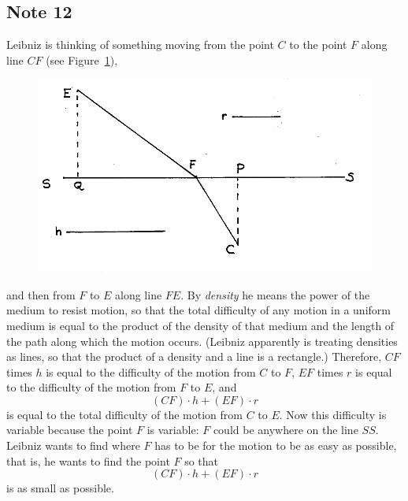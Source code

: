 \documentclass[twoside,openright]{article}
\begin{document}
\subsection*{Note 12}
\label{cnm12}

Leibniz is thinking of something moving from the point $C$ to the
point $F$ along line $CF$ (see Figure~\ref{leasttimeA}),
\begin{figure}[htp]
\begin{center}
\includegraphics[width=.85\textwidth]{fig/Figure21}
\caption{}
\label{leasttimeA}
\vspace{-10pt}
\end{center}
\end{figure} and then from $F$ to $E$ along line $FE$.  By {\em
  density} he means the power of the medium to resist motion, so that
the total difficulty of any motion in a uniform medium is equal to the
product of the density of that medium and the length of the path along
which the motion occurs.  (Leibniz apparently is treating densities as
lines, so that the product of a density and a line is a rectangle.)
Therefore, $CF$ times $h$ is equal to the difficulty of the motion
from $C$ to $F$, $EF$ times $r$ is equal to the difficulty of the
motion from $F$ to $E$, and
$$(CF)\cdot h + (EF) \cdot r$$
is equal to the total difficulty of the motion from $C$ to $E$.  Now
this difficulty is variable because the point $F$ is variable: $F$
could be anywhere on the line $SS$.  Leibniz wants to find where $F$
has to be for the motion to be as easy as possible, that is, he wants
to find the point $F$ so that
$$(CF)\cdot h + (EF) \cdot r$$
is as small as possible.
\end{document}
